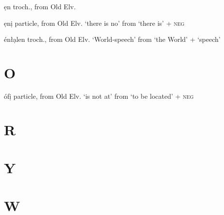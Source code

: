 \begin{multicols*}{2}
\begin{entrylist}
    \begin{dictentry}{ẹn}{
        troch., from Old Elv. 
    }\label{enl:en_L}
    \end{dictentry}
    \begin{dictentry}{ẹnị}{
        particle, from Old Elv.  `there is no' from  `there is' +  \textsc{neg}
    }\label{enl:eni_LL}
    \end{dictentry}
    \begin{dictentry}{énłạlen}{
        troch., from Old Elv.  `World-speech' from  `the World' +  `speech'
        }
        \label{enl:enLalen_HLM}
    \end{dictentry}
\end{entrylist}

\section{O}

\begin{entrylist}
    \begin{dictentry}{ófị}{
        particle, from Old Elv.  `is not at' from  `to be located' +  \textsc{neg}
    }\label{enl:ofi_HL}
    \end{dictentry}
\end{entrylist}

\section{R}

\section{Y}

\section{W}


\end{multicols*}
